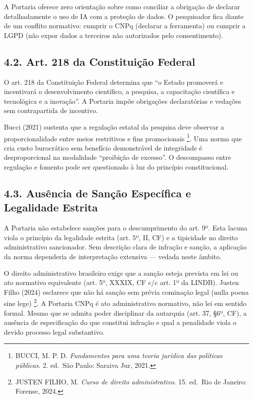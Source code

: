 \documentclass[
  12pt,
  a4paper,
  brazil,
  twoside
]{report}
\begin{document}
A Portaria oferece zero orientação sobre como conciliar a obrigação de
declarar detalhadamente o uso de IA com a proteção de dados. O
pesquisador fica diante de um conflito normativo: cumprir o CNPq
(declarar a ferramenta) ou cumprir a LGPD (não expor dados a terceiros
não autorizados pelo consentimento).

\subsection{4.2. Art. 218 da Constituição
Federal}\label{art.-218-da-constituiuxe7uxe3o-federal}

O art. 218 da Constituição Federal determina que ``o Estado promoverá e
incentivará o desenvolvimento científico, a pesquisa, a capacitação
científica e tecnológica e a inovação''. A Portaria impõe obrigações
declaratórias e vedações sem contrapartida de incentivo.

Bucci (2021) sustenta que a regulação estatal da pesquisa deve observar
a proporcionalidade entre meios restritivos e fins promocionais
\footnote{BUCCI, M. P. D. \emph{Fundamentos para uma teoria jurídica das
  políticas públicas}. 2. ed.~São Paulo: Saraiva Jur, 2021.}. Uma norma
que cria custo burocrático sem benefício demonstrável de integridade é
desproporcional na modalidade ``proibição de excesso''. O descompasso
entre regulação e fomento pode ser questionado à luz do princípio
constitucional.

\subsection{4.3. Ausência de Sanção Específica e Legalidade
Estrita}\label{ausuxeancia-de-sanuxe7uxe3o-especuxedfica-e-legalidade-estrita}

A Portaria não estabelece sanções para o descumprimento do art. 9º. Esta
lacuna viola o princípio da legalidade estrita (art. 5º, II, CF) e a
tipicidade no direito administrativo sancionador. Sem descrição clara de
infração e sanção, a aplicação da norma dependeria de interpretação
extensiva --- vedada neste âmbito.

O direito administrativo brasileiro exige que a sanção esteja prevista
em lei ou ato normativo equivalente (art. 5º, XXXIX, CF c/c art. 1º da
LINDB). Justen Filho (2024) esclarece que não há sanção sem prévia
cominação legal (nulla poena sine lege) \footnote{JUSTEN FILHO, M.
  \emph{Curso de direito administrativo}. 15. ed.~Rio de Janeiro:
  Forense, 2024.}. A Portaria CNPq é ato administrativo normativo, não
lei em sentido formal. Mesmo que se admita poder disciplinar da
autarquia (art. 37, §6º, CF), a ausência de especificação do que
constitui infração e qual a penalidade viola o devido processo legal
substantivo.
\end{document}
